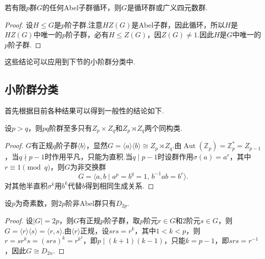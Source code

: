 \begin{cor*}
	若有限$p$群$G$的任何Abel子群循环，则$G$是循环群或广义四元数群.
\end{cor*}
\begin{proof}
	设$H\le G$是$p$阶子群.注意$HZ(G)$是Abel子群，因此循环，所以$H$是$HZ(G)$中唯一的$p$阶子群，必有$H\le Z(G)$，因$Z(G)\ne 1$.因此$H$是$G$中唯一的$p$阶子群.
\end{proof}

这些结论可以应用到下节的小阶群分类中.

\subsection{小阶群分类}
首先根据目前各种结果可以得到一般性的结论如下.
\begin{prop}
	设$p>q$，则$pq$阶群至多只有$Z_p\times Z_q$和$Z_p\rtimes Z_q$两个同构类.
\end{prop}
\begin{proof}
	$G$有正规$q$阶子群$\langle b\rangle $，显然$G=\langle a\rangle\langle b\rangle \cong Z_p\rtimes Z_q$.由$\operatorname*{Aut}(\mathbb{Z}_p)=\mathbb{Z}_p^*=Z_{p-1}$，当$q\nmid p-1$时作用平凡，只能为直积.当$q\mid p-1$时设群作用$\sigma(a)=a^r$，其中$r\equiv 1\pmod{q}$，则$G$为非交换群
	\[
		G=\langle a,b\mid a^p=b^q=1,\,b^{-1}ab=b^r\rangle .
	\]
	对其他半直积$\sigma^k$用$b^k$代替$b$得到相同生成关系.
\end{proof}
\begin{prop}
	设$p$为奇素数，则$2p$阶非Abel群只有$D_{2p}$.
\end{prop}
\begin{proof}
	设$|G|=2p$，则$G$有正规$p$阶子群，取$p$阶元$r\in G$和$2$阶元$s\in G$，则$G=\langle r\rangle \langle s\rangle =\langle r,s\rangle $.由$\langle r\rangle $正规，设$srs=r^k$，其中$1<k<p$，则$r=sr^ks=(srs)^k=r^{k^2}$，即$p\mid(k+1)(k-1)$，只能$k=p-1$，即$srs=r^{-1}$，因此$G\cong D_{2n}$.
\end{proof}

